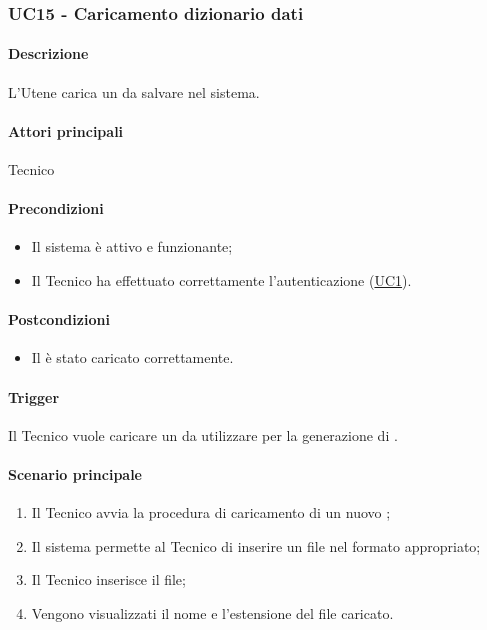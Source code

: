 \subsubsection{UC15 - Caricamento dizionario dati}\label{UC15}

\paragraph*{Descrizione}
L'Utene carica un  da salvare nel sistema.

\paragraph*{Attori principali}
Tecnico

\paragraph*{Precondizioni}
\begin{itemize}
  \item Il sistema è attivo e funzionante;
  \item Il Tecnico ha effettuato correttamente l'autenticazione (\hyperref[UC1]{UC1}).
\end{itemize}

\paragraph*{Postcondizioni}
\begin{itemize}
  \item Il  è stato caricato correttamente.
\end{itemize}

\paragraph*{Trigger}
Il Tecnico vuole caricare un  da utilizzare per la generazione di .

\paragraph*{Scenario principale}
\begin{enumerate}
  \item Il Tecnico avvia la procedura di caricamento di un nuovo ;
  \item Il sistema permette al Tecnico di inserire un file nel formato appropriato;
  \item Il Tecnico inserisce il file;
  \item Vengono visualizzati il nome e l'estensione del file caricato.
\end{enumerate}
